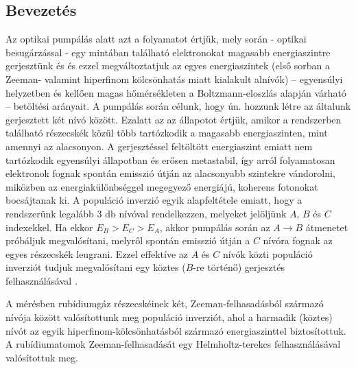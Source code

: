 \begin{multicols}{2}
\section{Bevezetés}
Az optikai pumpálás alatt azt a folyamatot értjük, mely során - optikai besugárzással - egy mintában található elektronokat magasabb energiaszintre gerjesztünk és és ezzel megváltoztatjuk az egyes energiaszintek (első sorban a Zeeman- valamint hiperfinom kölcsönhatás miatt kialakult alnívók) -- egyensúlyi helyzetben és kellően magas hőmérsékleten a Boltzmann-eloszlás alapján várható -- betöltési arányait. A pumpálás során célunk, hogy ún.  hozzunk létre az általunk gerjesztett két nívó között. Ezalatt az az állapotot értjük, amikor a rendszerben található részecskék közül több tartózkodik a magasabb energiaszinten, mint amennyi az alacsonyon. A gerjesztéssel feltöltött energiaszint emiatt nem tartózkodik egyensúlyi állapotban és erősen metastabil, így arról folyamatosan elektronok fognak spontán emisszió útján az alacsonyabb szintekre vándorolni, miközben az energiakülönbséggel megegyező energiájú, koherens fotonokat bocsájtanak ki. A populáció inverzió egyik alapfeltétele emiatt, hogy a rendszerünk legalább $3$ db nívóval rendelkezzen, melyeket jelöljünk $A$, $B$ és $C$ indexekkel. Ha ekkor $E_{B} > E_{C} > E_{A}$, akkor pumpálás során az $A \to B$ átmenetet próbáljuk megvalósítani, melyről spontán emisszió útján a $C$ nívóra fognak az egyes részecskék leugrani. Ezzel effektíve az $A$ és $C$ nívók közti populáció inverziót tudjuk megvalósítani egy köztes ($B$-re történő) gerjesztés felhasználásával \citep{kubo1972optical}. \par
A mérésben rubídiumgáz részecskéinek két, Zeeman-felhasadásból származó nívója között valósítottunk meg populáció inverziót, ahol a harmadik (köztes) nívót az egyik hiperfinom-kölcsönhatásból származó energiaszinttel biztosítottuk. A rubídiumatomok Zeeman-felhasadását egy Helmholtz-terekcs felhasználásával valósítottuk meg.



\end{multicols}
